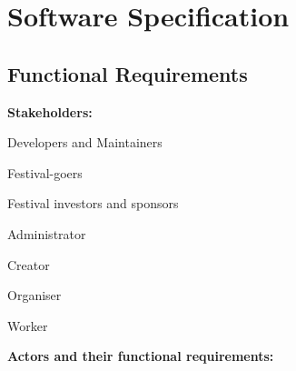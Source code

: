 \chapter{Software Specification}
		
	\section{Functional Requirements}
			

			\noindent \textbf{Stakeholders:}
			
			\begin{packed_enum}
				
				\item Developers and Maintainers
				\item Festival-goers
				\item Festival investors and sponsors
				\item Administrator			
				\item Creator
				\item Organiser
				\item Worker
				
			\end{packed_enum}
			
			\noindent \textbf{Actors and their functional requirements:}
			
